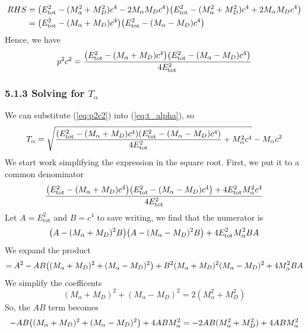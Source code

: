 \documentclass[12pt,a4paper]{article}
\begin{document}
\begin{solution_pset}
\begin{align*}
				RHS
				&=
				\pqty{
					E_\text{tot}^2 - (M_\alpha^2 + M_D^2)c^4 - 2M_\alpha M_D c^4
				}
				\pqty{
					E_\text{tot}^2 - (M_\alpha^2 + M_D^2)c^4 + 2M_\alpha M_D c^4
				}\\
				&=
				\pqty{
					E_\text{tot}^2 - (M_\alpha + M_D)c^4 
				}
				\pqty{
					E_\text{tot}^2 - (M_\alpha - M_D)c^4 
				}
			\end{align*}
			Hence, we have
			\begin{equation}
				\label{eq:p2c2}
				p^2c^2
				=
				\frac{
					\pqty{
						E_\text{tot}^2 - (M_\alpha + M_D)c^4 
					}
					\pqty{
						E_\text{tot}^2 - (M_\alpha - M_D)c^4 
					}
				}{
					4E_\text{tot}^2
				} 
			\end{equation}
		\subsubsection*{5.1.3 Solving for $T_\alpha$}
			We can substitute (\ref{eq:p2c2}) into (\ref{eq:t_alpha}), so
			\begin{equation}
				\label{eq:t_alpha2}
				T_\alpha = 
				\sqrt{
					\frac{
						\pqty{
							E_\text{tot}^2 - (M_\alpha + M_D)c^4 
						}
						\pqty{
							E_\text{tot}^2 - (M_\alpha - M_D)c^4 
						}
					}{
						4E_\text{tot}^2
					} 
					+ M_\alpha^2 c^4
				} 
				- M_\alpha c^2
			\end{equation}
			We start work simplifying the expression in the square root. First, we put it
			to a common denominator
			\[
				\frac{
					\pqty{
						E_\text{tot}^2 - (M_\alpha + M_D)c^4 
					}
					\pqty{
						E_\text{tot}^2 - (M_\alpha - M_D)c^4 
					}
					+ 
					4E_\text{tot}^2
					M_\alpha^2 c^4
				}{
					4E_\text{tot}^2
				} 
			\]
			Let $A = E_\text{tot}^2$ and $B = c^4$ to save writing, we find that the numerator is
			\[
				\pqty{
					A - (M_\alpha + M_D)^2 B
				}
				\pqty{
					A - (M_\alpha - M_D)^2 B
				}
				+
				4E_\text{tot}^2
				M_\alpha^2 BA
			\]
			We expand the product
			\[
				= 
				A^2 
				- AB
				\pqty{
					(M_\alpha + M_D)^2 +
					(M_\alpha - M_D)^2 
				}
				+
				B^2
				(M_\alpha + M_D)^2 
				(M_\alpha - M_D)^2 
				+
				4M_\alpha^2 BA
			\]
			We simplify the coefficents
			\[
				(M_\alpha + M_D)^2 +
				(M_\alpha - M_D)^2
				=
				2(M_\alpha^2 + M_D^2)
			\]
			So, the $AB$ term becomes
			\begin{align*}
				- AB
				\pqty{
					(M_\alpha + M_D)^2 +
					(M_\alpha - M_D)^2 
				} + 4AB M_\alpha^2
				&=
				- 2AB
				(M_\alpha^2 + M_D^2) + 4AB M_\alpha^2
				\\

\end{align*}
\end{solution_pset}
\end{document}
